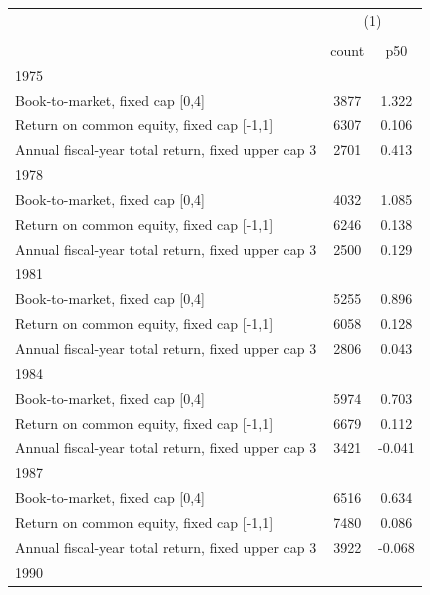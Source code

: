 {
\def\sym#1{\ifmmode^{#1}\else\(^{#1}\)\fi}
\begin{tabular}{l*{1}{cc}}
\hline\hline
                    &\multicolumn{2}{c}{(1)}  \\
                    &\multicolumn{2}{c}{}     \\
                    &       count&         p50\\
\hline
1975                &            &            \\
Book-to-market, fixed cap [0,4]&        3877&       1.322\\
Return on common equity, fixed cap [-1,1]&        6307&       0.106\\
Annual fiscal-year total return, fixed upper cap 3&        2701&       0.413\\
\hline
1978                &            &            \\
Book-to-market, fixed cap [0,4]&        4032&       1.085\\
Return on common equity, fixed cap [-1,1]&        6246&       0.138\\
Annual fiscal-year total return, fixed upper cap 3&        2500&       0.129\\
\hline
1981                &            &            \\
Book-to-market, fixed cap [0,4]&        5255&       0.896\\
Return on common equity, fixed cap [-1,1]&        6058&       0.128\\
Annual fiscal-year total return, fixed upper cap 3&        2806&       0.043\\
\hline
1984                &            &            \\
Book-to-market, fixed cap [0,4]&        5974&       0.703\\
Return on common equity, fixed cap [-1,1]&        6679&       0.112\\
Annual fiscal-year total return, fixed upper cap 3&        3421&      -0.041\\
\hline
1987                &            &            \\
Book-to-market, fixed cap [0,4]&        6516&       0.634\\
Return on common equity, fixed cap [-1,1]&        7480&       0.086\\
Annual fiscal-year total return, fixed upper cap 3&        3922&      -0.068\\
\hline
1990                &            &            \\

\end{tabular}}
